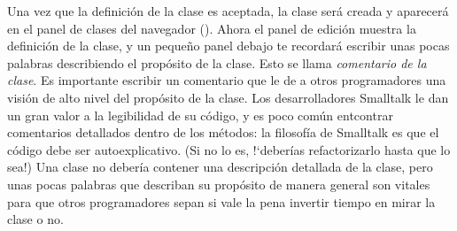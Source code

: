 \documentclass[a4paper,10pt,twoside]{book}
\begin{document}

Una vez que la definici\'on de la clase es aceptada, la clase ser\'a creada y aparecer\'a en el panel de clases del navegador ().
Ahora el panel de edici\'on muestra la definici\'on de la clase, y un pequeño panel debajo te recordar\'a escribir unas pocas palabras describiendo el prop\'osito de la clase. Esto se llama \emph {comentario de la clase}. Es importante escribir un comentario que le de a otros programadores una visi\'on de alto nivel del prop\'osito de la clase.
Los desarrolladores Smalltalk le dan un gran valor a la legibilidad de su c\'odigo, y es poco com\'un entcontrar comentarios detallados dentro de los m\'etodos: la filosof\'ia de Smalltalk es que el c\'odigo debe ser autoexplicativo. (Si no lo es, !`deber\'ias refactorizarlo hasta que lo sea!) Una clase  no deber\'ia contener una descripci\'on detallada de la clase, pero unas pocas palabras que describan su prop\'osito de manera general son vitales para que otros programadores sepan si vale la pena invertir tiempo en mirar la clase o no.

\end{document}
